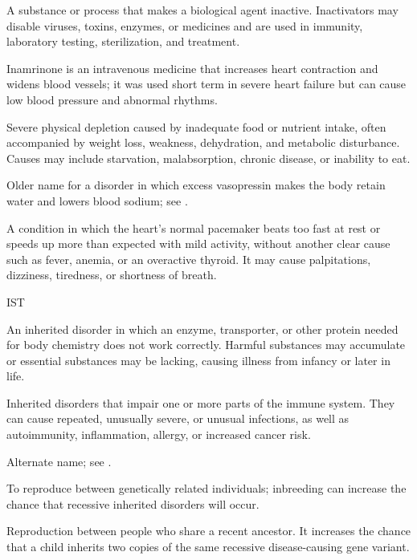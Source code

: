  A substance or process that makes a biological agent inactive. Inactivators may disable viruses, toxins, enzymes, or medicines and are used in immunity, laboratory testing, sterilization, and treatment.

 Inamrinone is an intravenous medicine that increases heart contraction and widens blood vessels; it was used short term in severe heart failure but can cause low blood pressure and abnormal rhythms.

 Severe physical depletion caused by inadequate food or nutrient intake, often accompanied by weight loss, weakness, dehydration, and metabolic disturbance. Causes may include starvation, malabsorption, chronic disease, or inability to eat.

 Older name for a disorder in which excess vasopressin makes the body retain water and lowers blood sodium; see .

 A condition in which the heart’s normal pacemaker beats too fast at rest or speeds up more than expected with mild activity, without another clear cause such as fever, anemia, or an overactive thyroid. It may cause palpitations, dizziness, tiredness, or shortness of breath.

\synonyms
IST

 An inherited disorder in which an enzyme, transporter, or other protein needed for body chemistry does not work correctly. Harmful substances may accumulate or essential substances may be lacking, causing illness from infancy or later in life.

 Inherited disorders that impair one or more parts of the immune system. They can cause repeated, unusually severe, or unusual infections, as well as autoimmunity, inflammation, allergy, or increased cancer risk.

 Alternate name; see .

 To reproduce between genetically related individuals; inbreeding can increase the chance that recessive inherited disorders will occur.

 Reproduction between people who share a recent ancestor. It increases the chance that a child inherits two copies of the same recessive disease-causing gene variant.

